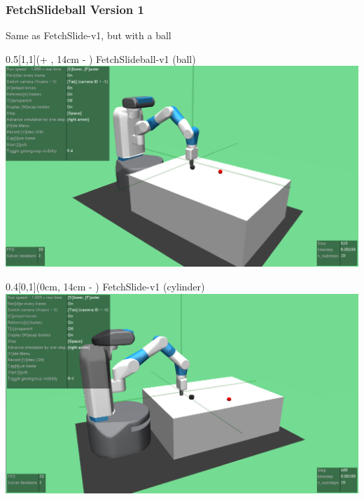 \begin{frame}
	\frametitle{FetchSlideball Version 1}	
	\vspace{1cm}
	
	Same as FetchSlide-v1, but with a ball
	
    
    \begin{textblock*}{0.5\paperwidth}[1,1](\textwidth + \PraesentationSeitenrand, 14cm - \PraesentationSeitenrand)%
    	FetchSlideball-v1 (ball)
    	\includegraphics[width=0.4\paperwidth]{./Ressourcen/Figures/FetchSlideball-v1.pdf}
    \end{textblock*}
    
    	
	
    \begin{textblock*}{0.4\paperwidth}[0,1](0cm, 14cm - \PraesentationSeitenrand)%
    	FetchSlide-v1 (cylinder)
        \includegraphics[width=0.4\paperwidth]{./Ressourcen/Figures/FetchSlide-v1.pdf}
    \end{textblock*}
    

	
	
\end{frame}
\clearpage

